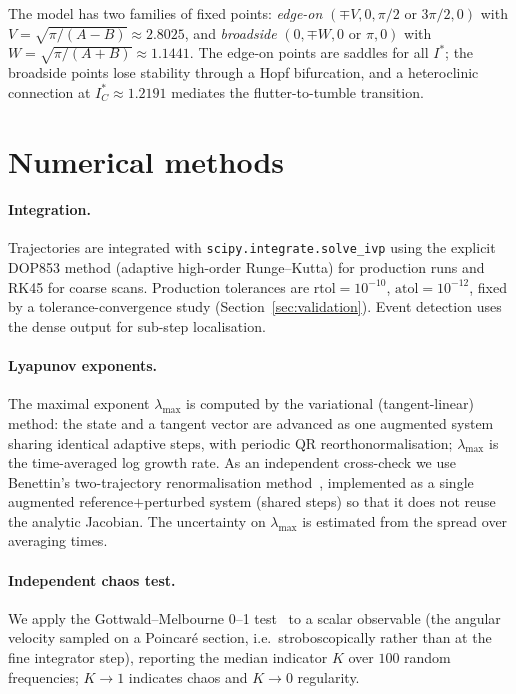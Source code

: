 \documentclass[11pt]{article}
\newcommand{\Is}{I^{*}}          %
\newcommand{\lmax}{\lambda_{\max}}
\begin{document}
The model has two families of fixed points: \emph{edge-on} $(\mp V,0,\pi/2\text{ or }3\pi/2,0)$ with
$V=\sqrt{\pi/(A-B)}\approx2.8025$, and \emph{broadside} $(0,\mp W,0\text{ or }\pi,0)$ with
$W=\sqrt{\pi/(A+B)}\approx1.1441$. The edge-on points are saddles for all $\Is$; the broadside points
lose stability through a Hopf bifurcation, and a heteroclinic connection at $\Is_C\approx1.2191$
mediates the flutter-to-tumble transition.

\section{Numerical methods}\label{sec:methods}

\paragraph{Integration.} Trajectories are integrated with \texttt{scipy.integrate.solve\_ivp} using
the explicit DOP853 method (adaptive high-order Runge--Kutta) for production runs and RK45 for coarse
scans. Production tolerances are $\mathrm{rtol}=10^{-10}$, $\mathrm{atol}=10^{-12}$, fixed by a
tolerance-convergence study (Section~\ref{sec:validation}). Event detection uses the dense output for
sub-step localisation.

\paragraph{Lyapunov exponents.} The maximal exponent $\lmax$ is computed by the variational
(tangent-linear) method: the state and a tangent vector are advanced as one augmented system sharing
identical adaptive steps, with periodic QR reorthonormalisation; $\lmax$ is the time-averaged log
growth rate. As an independent cross-check we use Benettin's two-trajectory renormalisation
method~\cite{benettin80}, implemented as a single augmented reference$+$perturbed system (shared
steps) so that it does not reuse the analytic Jacobian. The uncertainty on $\lmax$ is estimated from
the spread over averaging times.

\paragraph{Independent chaos test.} We apply the Gottwald--Melbourne 0--1 test~\cite{gm04,gm09} to a
scalar observable (the angular velocity sampled on a Poincar\'e section, i.e.\ stroboscopically rather
than at the fine integrator step), reporting the median indicator $K$ over $100$ random frequencies;
$K\to1$ indicates chaos and $K\to0$ regularity.
\end{document}
